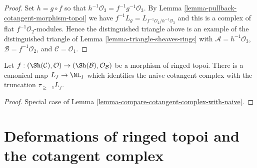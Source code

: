 \begin{proof}
Set $h = g \circ f$ so that $h^{-1}\mathcal{O}_3 = f^{-1}g^{-1}\mathcal{O}_3$.
By Lemma \ref{lemma-pullback-cotangent-morphism-topoi} we have
$f^{-1}L_g = L_{f^{-1}\mathcal{O}_2/h^{-1}\mathcal{O}_3}$
and this is a complex of flat $f^{-1}\mathcal{O}_2$-modules.
Hence the distinguished triangle above is an example of the
distinguished triangle of
Lemma \ref{lemma-triangle-sheaves-rings}
with $\mathcal{A} = h^{-1}\mathcal{O}_3$, $\mathcal{B} = f^{-1}\mathcal{O}_2$,
and $\mathcal{C} = \mathcal{O}_1$.
\end{proof}

\begin{lemma}
\label{lemma-compare-cotangent-complex-with-naive-ringed-topoi}
Let $f : (\Sh(\mathcal{C}), \mathcal{O}) \to
(\Sh(\mathcal{B}), \mathcal{O}_\mathcal{B})$ be a morphism of
ringed topoi. There is a canonical map $L_f \to \NL_f$ which
identifies the naive cotangent complex with the truncation
$\tau_{\geq -1}L_f$.
\end{lemma}

\begin{proof}
Special case of Lemma \ref{lemma-compare-cotangent-complex-with-naive}.
\end{proof}








\section{Deformations of ringed topoi and the cotangent complex}
\label{section-deformations-ringed-topoi}

